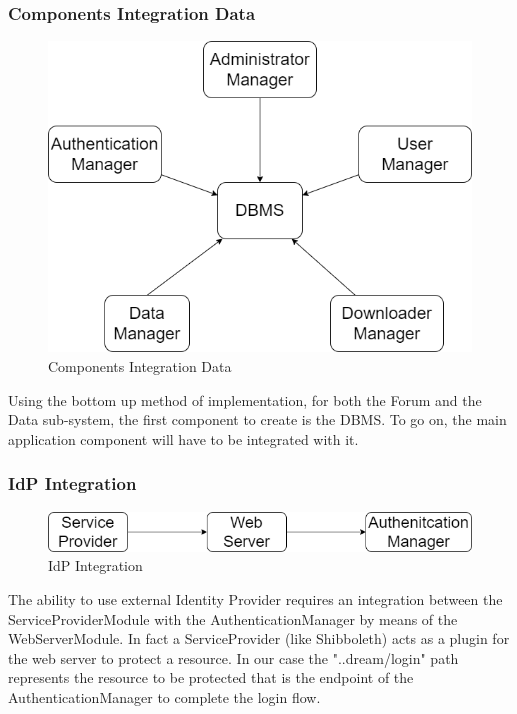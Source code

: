 \newpage
\subsubsection{Components Integration Data}
\begin{figure}[h!]
        \centering
        \includegraphics[scale=0.5]{images/component_integration/components_integration_data.png}
        \caption{Components Integration Data}
        \label{fig:components_integration_data}
\end{figure}
\FloatBarrier

Using the bottom up method of implementation, for both the Forum and the Data sub-system, the first component to create is the DBMS. To go on, the main application component will have to be integrated with it.

\subsubsection{IdP Integration}
\begin{figure}[h!]
        \centering
        \includegraphics[scale=0.5]{images/component_integration/idp_integration.png}
        \caption{IdP Integration}
        \label{fig:idp_integration}
\end{figure}
\FloatBarrier

The ability to use external Identity Provider requires an integration between the ServiceProviderModule with the AuthenticationManager by means of the WebServerModule. In fact a ServiceProvider (like Shibboleth) acts as a plugin for the web server to protect a resource. In our case the "..dream/login" path represents the resource to be protected that is the endpoint of the AuthenticationManager to complete the login flow.

